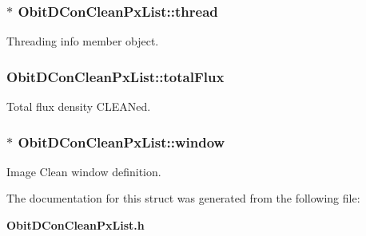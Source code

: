 \subsubsection{$\ast$ {\bf Obit\-DCon\-Clean\-Px\-List::thread}}\label{structObitDConCleanPxList_o4}


Threading info member object. 

\subsubsection{ {\bf Obit\-DCon\-Clean\-Px\-List::total\-Flux}}\label{structObitDConCleanPxList_o12}


Total flux density CLEANed. 

\subsubsection{$\ast$ {\bf Obit\-DCon\-Clean\-Px\-List::window}}\label{structObitDConCleanPxList_o7}


Image Clean window definition. 



The documentation for this struct was generated from the following file:\begin{CompactItemize}
\item 
{\bf Obit\-DCon\-Clean\-Px\-List.h}\end{CompactItemize}
